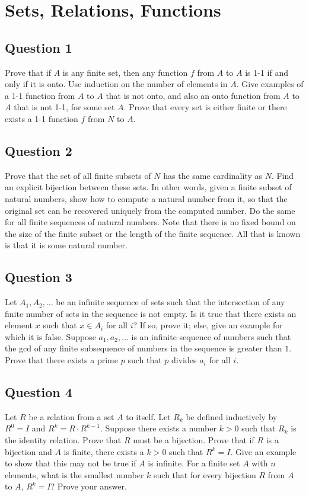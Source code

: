\documentclass[12pt]{report}
\begin{document}
\chapter{Sets, Relations, Functions}
\section*{Question 1}
Prove that if $A$ is any finite set, then any function $f$ from $A$ to $A$ is 1-1 if and only if it is onto. Use induction on the number of elements in $A$. Give examples of a 1-1 function from $A$ to $A$ that is not onto, and also an onto function from $A$ to $A$ that is not 1-1, for some set $A$. Prove that every set is either finite or there exists a 1-1 function $f$ from $N$ to $A$.

\section*{Question 2}
Prove that the set of all finite subsets of $N$ has the same cardinality as $N$. Find an explicit bijection between these sets. In other words, given a finite subset of natural numbers, show how to compute a natural number from it, so that the original set can be recovered uniquely from the computed number. Do the same for all finite sequences of natural numbers. Note that there is no fixed bound on the size of the finite subset or the length of the finite sequence. All that is known is that it is some natural number.

\section*{Question 3}
Let $A_1, A_2, \ldots$ be an infinite sequence of sets such that the intersection of any finite number of sets in the sequence is not empty. Is it true that there exists an element $x$ such that $x \in A_i$ for all $i$? If so, prove it; else, give an example for which it is false. Suppose $a_1, a_2, \ldots$ is an infinite sequence of numbers such that the gcd of any finite subsequence of numbers in the sequence is greater than $1$. Prove that there exists a prime $p$ such that $p$ divides $a_i$ for all $i$.

\section*{Question 4}
Let $R$ be a relation from a set $A$ to itself. Let $R_k$ be defined inductively by $R^0 = I$ and $R^k = R \cdot R^{k-1}$. Suppose there exists a number $k > 0$ such that $R_k$ is the identity relation. Prove that $R$ must be a bijection. Prove that if $R$ is a bijection and $A$ is finite, there exists a $k > 0$ such that $R^k = I$. Give an example to show that this may not be true if $A$ is infinite. For a finite set $A$ with $n$ elements, what is the smallest number $k$ such that for every bijection $R$ from $A$ to $A$, $R^k = I$? Prove your answer.
\end{document}
